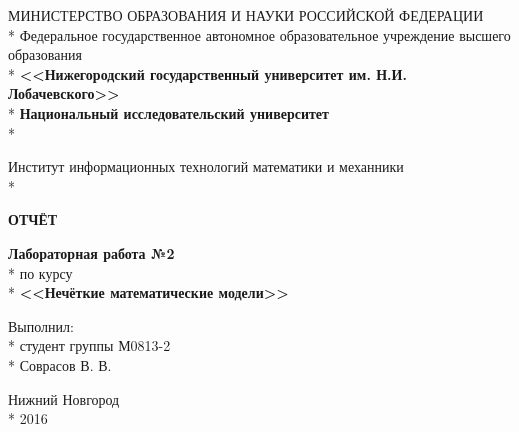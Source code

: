 \begin{titlepage}

\begin{center}
\fontsize{14pt}{0pt}МИНИСТЕРСТВО ОБРАЗОВАНИЯ И НАУКИ РОССИЙСКОЙ ФЕДЕРАЦИИ \\*
\fontsize{14pt}{0pt}Федеральное   государственное  автономное  образовательное  учреждение высшего образования \\*
\fontsize{14pt}{0pt}\textbf{<<Нижегородский государственный университет им. Н.И. Лобачевского>>} \\*
\fontsize{14pt}{0pt}\textbf{Национальный исследовательский университет} \\*
\end{center}

\vspace{12pt}

\begin{center}
\fontsize{14pt}{0pt}Институт информационных технологий математики и механники \\*
\end{center}

\vspace{50pt}

\vspace{45pt}

\begin{center}
\fontsize{18pt}{0pt}\textbf{ОТЧЁТ}
\end{center}

\begin{center}
\fontsize{16pt}{0pt}\textbf{Лабораторная работа №2} \\*
по курсу \\*
\textbf{<<Нечёткие математические модели>>}
\end{center}

\vspace{80pt}

\begin{flushright}
Выполнил:  \\*
студент группы М0813-2  \\*
Соврасов В. В. 
\end{flushright}


\vspace{\fill}

\begin{center}
Нижний Новгород \\*
2016
\end{center}

\end{titlepage}
